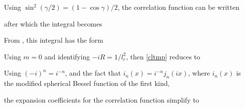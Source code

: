 %

Using $\sin^2(\gamma/2) = (1 - \cos \gamma)/2$, the correlation function can be written

\noindent after which the integral becomes

From \cite{neves2006analytical, gouesbet1994rigorous}, this integral has the form



Using $m=0$ and identifying $- i R = 1/l_c^2$, then \eqref{cltmp} reduces to

Using $(-i)^n = i^{-n}$, and the fact that $i_n(x) = i^{-n} j_n(i x)$, where $i_n(x)$ is the modified spherical Bessel function of the first kind,

\noindent the expansion coefficients for the correlation function simplify to 

